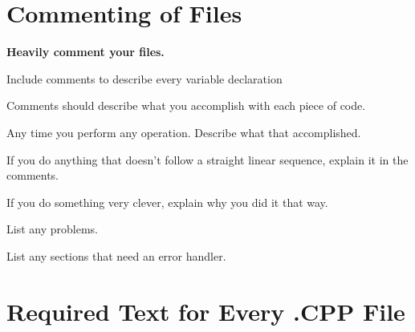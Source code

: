 \section*{Commenting of Files}

{\bfseries Heavily comment your files.}


\begin{DoxyItemize}
\item Include comments to describe every variable declaration
\item Comments should describe what you accomplish with each piece of code.
\begin{DoxyItemize}
\item Any time you perform any operation. Describe what that accomplished.
\end{DoxyItemize}
\item If you do anything that doesn't follow a straight linear sequence, explain it in the comments.
\item If you do something very clever, explain why you did it that way.
\item List any problems.
\item List any sections that need an error handler.
\end{DoxyItemize}

\section*{Required Text for Every .C\-P\-P File}

